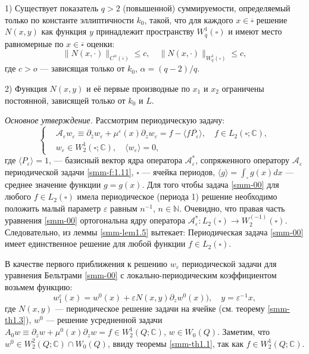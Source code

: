 	1) Существует показатель $q>2$ (повышенной) суммируемости, определяемый только по константе эллиптичности $k_0$, такой, что  для каждого $x\in\overline\square$ решение $N(x,y)$ как функция $y$ принадлежит пространству $W_q^1(\square)$ и имеют место равномерные по $x\in\overline\square$ оценки:
	$$
	\|N(x,\cdot)\|_{C^\alpha(\overline\square)}\leqslant c,\quad \|N(x,\cdot)\|_{W_q^1(\square)}\leqslant c,
	$$
	где $c>o$ --- зависящая только от $k_0$, $\alpha=(q-2)/q$.
	
	2) Функция $N(x,y)$ и её первые производные по $x_1$ и $x_2$ ограничены постоянной,
	зависящей только от $k_0$ и $L$.
	
	\textit{Основное утверждение.}
	Рассмотрим периодическую задачу:
	\begin{equation}\label{smm-00}
	\left\{\begin{aligned}
	&\mathscr{A}_\varepsilon w_\varepsilon\equiv \partial_{\bar{z}}w_\varepsilon +\mu^\varepsilon(x) \partial_{z}w_\varepsilon =f-\langle f\overline{P_\varepsilon}\rangle,\quad f\in L_2(\square;\mathbb{C}),\\
	&w_\varepsilon\in W_2^1(\square;\mathbb{C}),	\quad \langle w_\varepsilon\rangle=0,
	\end{aligned}\right.	
	\end{equation}
	   		где $\langle P_\varepsilon\rangle=1$, --- базисный вектор ядра оператора $\mathscr{A}_\varepsilon^\ast$, сопряженного оператору $\mathscr{A}_\varepsilon$ периодической задачи \eqref{smm-f:1.11}, $\square$ --- ячейка периодов, $\langle g\rangle=\int_\square g(x)dx$ --- среднее значение функции  $g=g(x)$. Для того чтобы задача \eqref{smm-00} для любого $f\in L_2(\square)$ имела периодическое (периода 1) решение необходимо положить малый параметр $\varepsilon$ равным $n^{-1}$, $n\in \mathbb{N}$.
		Очевидно, что правая часть  уравнения  \eqref{smm-00} ортогональна ядру оператора $\mathscr{A}_\varepsilon^\ast:L_2 (\square)\to W_2^(-1) (\square)$. Следовательно, из леммы \ref{smm-lem1.5} вытекает: Периодическая задача \eqref{smm-00} имеет единственное решение для любой функции $f\in L_2(\square)$.
		
	
	В качестве первого приближения к решению $w_\varepsilon$  периодической задачи
	для уравнения Бельтрами \eqref{smm-00} с локально-периодическим коэффициентом возьмем функцию:
	$$ w_1^\varepsilon(x)=w^0(x)+\varepsilon N(x,y)\partial_zw^0(x)), \quad y=\varepsilon^{-1}x,$$
где $N(x,y)$  --- периодическое решение задачи на ячейке (см. теорему \ref{smm-th1.3}), $w^0$ --- решение усредненной задачи $A_0w\equiv\partial_{\overline{z}}w+\mu^0(x)\partial_zw=f\in W_2^1(Q;\mathbb{C})$, $w\in W_0(Q)$. Заметим, что $w^0\in W_2^2(Q;\mathbb{C})\cap W_0(Q)$, ввиду 	теоремы \ref{smm-th1.1}, так как $f\in W_2^1(Q;\mathbb{C})$.
	

